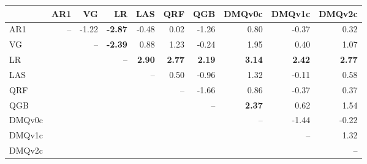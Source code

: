 \begin{tabular}{lrrrrrrrrr}
\toprule
 & AR1 & VG & LR & LAS & QRF & QGB & DMQv0c & DMQv1c & DMQv2c \\
\midrule
AR1 & -- & -1.22 & \textbf{-2.87} & -0.48 & 0.02 & -1.26 & 0.80 & -0.37 & 0.32 \\
VG &  & -- & \textbf{-2.39} & 0.88 & 1.23 & -0.24 & 1.95 & 0.40 & 1.07 \\
LR &  &  & -- & \textbf{2.90} & \textbf{2.77} & \textbf{2.19} & \textbf{3.14} & \textbf{2.42} & \textbf{2.77} \\
LAS &  &  &  & -- & 0.50 & -0.96 & 1.32 & -0.11 & 0.58 \\
QRF &  &  &  &  & -- & -1.66 & 0.86 & -0.37 & 0.37 \\
QGB &  &  &  &  &  & -- & \textbf{2.37} & 0.62 & 1.54 \\
DMQv0c &  &  &  &  &  &  & -- & -1.44 & -0.22 \\
DMQv1c &  &  &  &  &  &  &  & -- & 1.32 \\
DMQv2c &  &  &  &  &  &  &  &  & -- \\
\bottomrule
\end{tabular}
